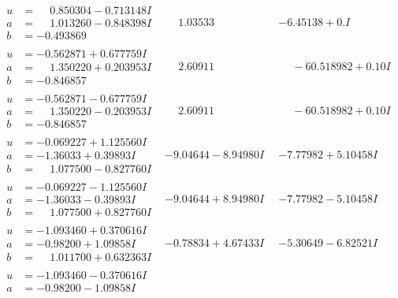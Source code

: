 \documentclass[1p]{elsarticle_modified}
\theoremstyle{definition}
\begin{document}
$$\begin{array}{c|c|c}
\begin{aligned}
u &= \phantom{-}0.850304 - 0.713148 I \\
a &= \phantom{-}1.013260 - 0.848398 I \\
b &= -0.493869\phantom{ +0.000000I}\end{aligned}
 & \phantom{-}1.03533\phantom{ +0.000000I} & -6.45138 + 0. I\phantom{ +0.000000I} \\ \hline\begin{aligned}
u &= -0.562871 + 0.677759 I \\
a &= \phantom{-}1.350220 + 0.203953 I \\
b &= -0.846857\phantom{ +0.000000I}\end{aligned}
 & \phantom{-}2.60911\phantom{ +0.000000I} & \phantom{-}                -6
0.518982 + 0. 10   I\phantom{ +0.000000I} \\ \hline\begin{aligned}
u &= -0.562871 - 0.677759 I \\
a &= \phantom{-}1.350220 - 0.203953 I \\
b &= -0.846857\phantom{ +0.000000I}\end{aligned}
 & \phantom{-}2.60911\phantom{ +0.000000I} & \phantom{-}                -6
0.518982 + 0. 10   I\phantom{ +0.000000I} \\ \hline\begin{aligned}
u &= -0.069227 + 1.125560 I \\
a &= -1.36033 + 0.39893 I \\
b &= \phantom{-}1.077500 - 0.827760 I\end{aligned}
 & -9.04644 - 8.94980 I & -7.77982 + 5.10458 I \\ \hline\begin{aligned}
u &= -0.069227 - 1.125560 I \\
a &= -1.36033 - 0.39893 I \\
b &= \phantom{-}1.077500 + 0.827760 I\end{aligned}
 & -9.04644 + 8.94980 I & -7.77982 - 5.10458 I \\ \hline\begin{aligned}
u &= -1.093460 + 0.370616 I \\
a &= -0.98200 + 1.09858 I \\
b &= \phantom{-}1.011700 + 0.632363 I\end{aligned}
 & -0.78834 + 4.67433 I & -5.30649 - 6.82521 I \\ \hline\begin{aligned}
u &= -1.093460 - 0.370616 I \\
a &= -0.98200 - 1.09858 I \\

\end{aligned}
\end{array}$$
\end{document}

